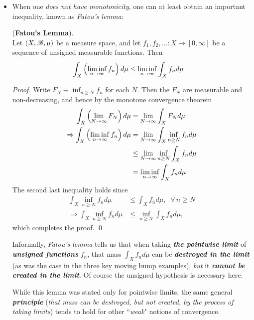 \documentclass[11pt]{article}
\begin{document}
\begin{itemize}
\item When one \emph{does not have monotonicity}, one can at least obtain an important inequality, known as \emph{Fatou's lemma}:
\begin{corollary} (\textbf{Fatou's Lemma}). \\
Let $(X, {\mathscr B}, \mu)$ be a measure space, and let $f_1, f_2, \ldots : X\rightarrow [0,\infty]$ be a sequence of unsigned measurable functions. Then
\begin{align*}
\int_{X}\left(\liminf\limits_{n\rightarrow \infty} f_{n}\right) d\mu &\le \liminf\limits_{n\rightarrow \infty}\int_{X}f_{n} d\mu 
\end{align*}
\end{corollary}
\begin{proof}
Write $F_N \equiv \inf_{n\ge N} f_n$ for each $N$. Then the $F_N$ are measurable and non-decreasing, and hence by the monotone convergence theorem
\begin{align*}
\int_{X}\left(\lim\limits_{N\rightarrow \infty} F_{N}\right) d\mu &= \lim\limits_{N\rightarrow \infty}\int_{X}F_{N} d\mu \\
\Rightarrow \int_{X}\left(\liminf\limits_{n\rightarrow \infty} f_{n}\right) d\mu  &= \lim\limits_{N\rightarrow \infty}\int_{X}\inf_{n\ge N} f_n d\mu\\
&\le \lim\limits_{N\rightarrow \infty} \inf_{n\ge N} \int_{X}f_n d\mu\\
&=   \liminf\limits_{n\rightarrow \infty}\int_{X}f_{n} d\mu 
\end{align*}
The second last inequality holds since
\begin{align*}
\int_{X}\inf_{n\ge N} f_n d\mu &\le \int_{X}f_n d\mu, \;\; \forall\, n\ge N\\
\Rightarrow \int_{X}\inf_{n\ge N} f_n d\mu &\le \inf_{n\ge N} \int_{X}f_n d\mu,  
\end{align*} which completes the proof. \qed
\end{proof}

\begin{remark}
Informally, \emph{Fatou's lemma} tells us that when taking \emph{\textbf{the pointwise limit}} of \textit{\textbf{unsigned functions}} $f_n$, that mass
$\int_{X}f_{n} d\mu$ can be \emph{\textbf{destroyed in the limit}} (as was the case in the three key moving bump examples), \emph{but} it \emph{\textbf{cannot be created in the limit}}. Of course the unsigned hypothesis is necessary here.

While this lemma was stated only for pointwise limits, the same general \emph{\textbf{principle}} (\emph{that mass can be destroyed, but not created, by the process of taking limits}) tends to hold for other ``\emph{weak}" notions of convergence.
\end{remark}


\end{itemize}
\end{document}
